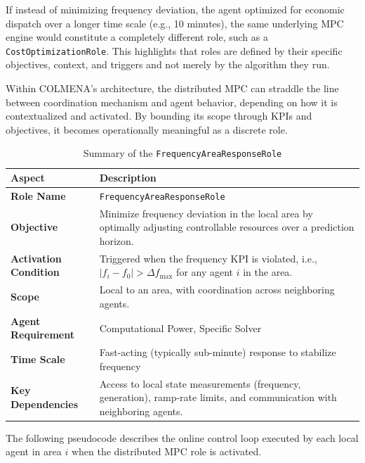 \documentclass{article}
\begin{document}
If instead of minimizing frequency deviation, the agent optimized for economic dispatch over a longer time scale (e.g., 10 minutes), the same underlying MPC engine would constitute a completely different role, such as a \texttt{CostOptimizationRole}. This highlights that roles are defined by their specific objectives, context, and triggers and not merely by the algorithm they run.

Within COLMENA’s architecture, the distributed MPC can straddle the line between coordination mechanism and agent behavior, depending on how it is contextualized and activated. By bounding its scope through KPIs and objectives, it becomes operationally meaningful as a discrete role.

\begin{table}[h!]
\centering
\begin{tabular}{|p{4cm}|p{10cm}|}
\hline
\textbf{Aspect} & \textbf{Description} \\
\hline
\textbf{Role Name} & \texttt{FrequencyAreaResponseRole} \\
\hline
\textbf{Objective} & Minimize frequency deviation in the local area by optimally adjusting controllable resources over a prediction horizon. \\
\hline
\textbf{Activation Condition} & Triggered when the frequency KPI is violated, i.e., $|f_i - f_0| > \Delta f_{\text{max}}$ for any agent $i$ in the area. \\
\hline
\textbf{Scope} & Local to an area, with coordination across neighboring agents. \\
\hline
\textbf{Agent Requirement} & Computational Power, Specific Solver\\
\hline
\textbf{Time Scale} & Fast-acting (typically sub-minute) response to stabilize frequency\\
\hline
\textbf{Key Dependencies} & Access to local state measurements (frequency, generation), ramp-rate limits, and communication with neighboring agents. \\
\hline
\end{tabular}
\caption{Summary of the \texttt{FrequencyAreaResponseRole}}
\end{table}

The following pseudocode describes the online control loop executed by each local agent in area $i$ when the distributed MPC role is activated.
\end{document}
